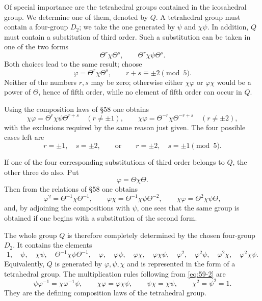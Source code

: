 \documentclass[11pt,a4paper]{book}
\begin{document}
Of special importance are the tetrahedral groups contained in the icosahedral group.  We determine one of them, denoted by \(Q\).  A tetrahedral group must contain a four-group \(D_2\); we take the one generated by \(\psi\) and \(\chi\psi\).  In addition, \(Q\) must contain a substitution of third order.  Such a substitution can be taken in one of the two forms
\[
 \Theta^r\chi\Theta^s,
 \qquad \Theta^r\chi\psi\Theta^s.
\]
Both choices lead to the same result; choose
\begin{equation}\label{eq:59-1}
 \varphi=\Theta^r\chi\Theta^s,
 \qquad r+s\equiv\pm2\pmod5.
\end{equation}
Neither of the numbers \(r,s\) may be zero; otherwise either \(\chi\varphi\) or \(\varphi\chi\) would be a power of \(\Theta\), hence of fifth order, while no element of fifth order can occur in \(Q\).

Using the composition laws of \S 58 one obtains
\[
 \chi\varphi=\Theta^r\chi\psi\Theta^{r+s}
 \quad (r\ne\pm1),
 \qquad
 \chi\varphi=\Theta^{-r}\chi\Theta^{-r+s}
 \quad (r\ne\pm2),
\]
with the exclusions required by the same reason just given.  The four possible cases left are
\[
 r=\pm1,
 \quad s=\pm2,
 \qquad\text{or}\qquad
 r=\pm2,
 \quad s=\pm1
 \pmod5.
\]

If one of the four corresponding substitutions of third order belongs to \(Q\), the other three do also.  Put
\begin{equation}\label{eq:59-2}
 \varphi=\Theta\chi\Theta.
\end{equation}
Then from the relations of \S 58 one obtains
\begin{equation}\label{eq:59-3}
 \varphi^2=\Theta^{-1}\chi\Theta^{-1},
 \qquad
 \varphi\chi=\Theta^{-1}\chi\psi\Theta^{-2},
 \qquad
 \chi\varphi=\Theta^2\chi\psi\Theta,
\end{equation}
and, by adjoining the compositions with \(\psi\), one sees that the same group is obtained if one begins with a substitution of the second form.

The whole group \(Q\) is therefore completely determined by the chosen four-group \(D_2\).  It contains the elements
\begin{equation}\label{eq:59-4}
 1,
 \quad \psi,
 \quad \chi\psi,
 \quad \Theta^{-1}\chi\psi\Theta^{-1},
 \quad \varphi,
 \quad \varphi\psi,
 \quad \varphi\chi,
 \quad \varphi\chi\psi,
 \quad \varphi^2,
 \quad \varphi^2\psi,
 \quad \varphi^2\chi,
 \quad \varphi^2\chi\psi.
\end{equation}
Equivalently, \(Q\) is generated by \(\varphi,\psi,\chi\) and is represented in the form of a tetrahedral group.  The multiplication rules following from \eqref{eq:59-2} are
\begin{equation}\label{eq:59-5}
 \psi\varphi^{-1}=\chi\varphi^{-1}\psi,
 \qquad
 \chi\varphi=\varphi\chi\psi,
 \qquad
 \psi\chi=\chi\psi,
 \qquad
 \chi^2=\psi^2=1.
\end{equation}
They are the defining composition laws of the tetrahedral group.
\end{document}
